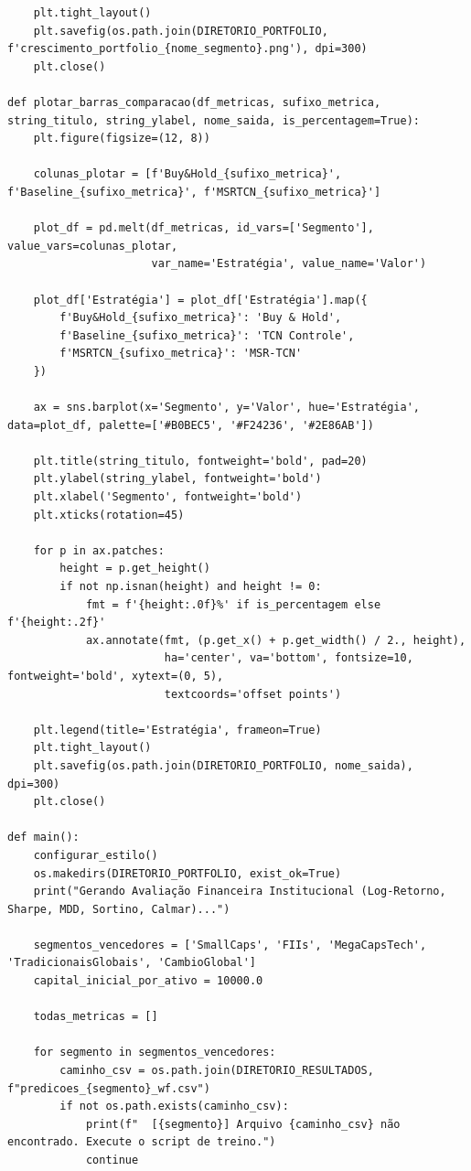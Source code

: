 \documentclass{article}
\begin{document}
\begin{verbatim}
    plt.tight_layout()
    plt.savefig(os.path.join(DIRETORIO_PORTFOLIO, f'crescimento_portfolio_{nome_segmento}.png'), dpi=300)
    plt.close()

def plotar_barras_comparacao(df_metricas, sufixo_metrica, string_titulo, string_ylabel, nome_saida, is_percentagem=True):
    plt.figure(figsize=(12, 8))
    
    colunas_plotar = [f'Buy&Hold_{sufixo_metrica}', f'Baseline_{sufixo_metrica}', f'MSRTCN_{sufixo_metrica}']
    
    plot_df = pd.melt(df_metricas, id_vars=['Segmento'], value_vars=colunas_plotar,
                      var_name='Estratégia', value_name='Valor')
    
    plot_df['Estratégia'] = plot_df['Estratégia'].map({
        f'Buy&Hold_{sufixo_metrica}': 'Buy & Hold',
        f'Baseline_{sufixo_metrica}': 'TCN Controle',
        f'MSRTCN_{sufixo_metrica}': 'MSR-TCN'
    })
    
    ax = sns.barplot(x='Segmento', y='Valor', hue='Estratégia', data=plot_df, palette=['#B0BEC5', '#F24236', '#2E86AB'])
    
    plt.title(string_titulo, fontweight='bold', pad=20)
    plt.ylabel(string_ylabel, fontweight='bold')
    plt.xlabel('Segmento', fontweight='bold')
    plt.xticks(rotation=45)
    
    for p in ax.patches:
        height = p.get_height()
        if not np.isnan(height) and height != 0:
            fmt = f'{height:.0f}%' if is_percentagem else f'{height:.2f}'
            ax.annotate(fmt, (p.get_x() + p.get_width() / 2., height),
                        ha='center', va='bottom', fontsize=10, fontweight='bold', xytext=(0, 5),
                        textcoords='offset points')
                        
    plt.legend(title='Estratégia', frameon=True)
    plt.tight_layout()
    plt.savefig(os.path.join(DIRETORIO_PORTFOLIO, nome_saida), dpi=300)
    plt.close()

def main():
    configurar_estilo()
    os.makedirs(DIRETORIO_PORTFOLIO, exist_ok=True)
    print("Gerando Avaliação Financeira Institucional (Log-Retorno, Sharpe, MDD, Sortino, Calmar)...")
    
    segmentos_vencedores = ['SmallCaps', 'FIIs', 'MegaCapsTech', 'TradicionaisGlobais', 'CambioGlobal']
    capital_inicial_por_ativo = 10000.0
    
    todas_metricas = []
    
    for segmento in segmentos_vencedores:
        caminho_csv = os.path.join(DIRETORIO_RESULTADOS, f"predicoes_{segmento}_wf.csv")
        if not os.path.exists(caminho_csv):
            print(f"  [{segmento}] Arquivo {caminho_csv} não encontrado. Execute o script de treino.")
            continue
            

\end{verbatim}
\end{document}
